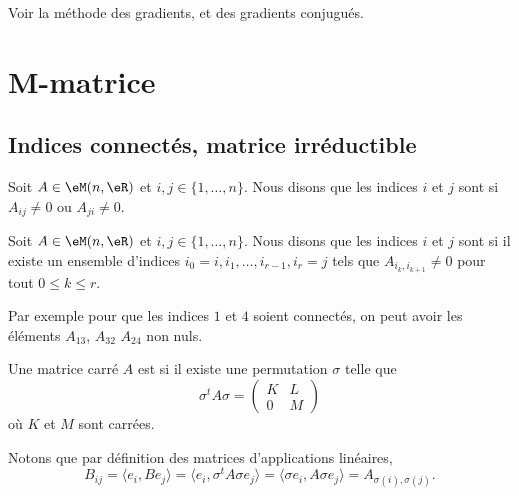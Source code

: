 Voir la méthode des gradients, et des gradients conjugués.

\section{M-matrice}

\subsection{Indices connectés, matrice irréductible}

\begin{definition}
    Soit \( A\in \eM(n,\eR)\) et \( i,j\in\{ 1,\ldots, n \}\). Nous disons que les indices \( i\) et \( j\) sont  si \( A_{ij}\neq 0\) ou \( A_{ji}\neq 0\).
\end{definition}

\begin{definition}
    Soit \( A\in \eM(n,\eR)\) et \( i,j\in\{ 1,\ldots, n \}\). Nous disons que les indices \( i\) et \( j\) sont  si il existe un ensemble d'indices \( i_0=i,i_1,\ldots, i_{r-1},i_r=j   \) tels que \( A_{i_k,i_{k+1}}\neq 0\) pour tout \( 0\leq k\leq r\).
\end{definition}

Par exemple pour que les indices \( 1\) et \( 4\) soient connectés, on peut avoir les éléments \( A_{13}\), \( A_{32}\) \( A_{24}\) non nuls.

\begin{definition}      \label{DEFooXIREooQtlzkO}
    Une matrice carré \( A\) est  si il existe une permutation \( \sigma\) telle que 
    \begin{equation}        \label{EQooGGZKooUyXSJk}
        \sigma^tA\sigma=\begin{pmatrix}
            K    &   L    \\ 
            0    &   M    
        \end{pmatrix}
    \end{equation}
    où \( K\) et \( M\) sont carrées.
\end{definition}
Notons que par définition des matrices d'applications linéaires,
\begin{equation}
    B_{ij}= \langle e_i, Be_j\rangle =\langle e_i, \sigma^tA\sigma e_j\rangle =\langle \sigma e_i, A\sigma e_j\rangle =A_{\sigma(i),\sigma(j)}.
\end{equation}

